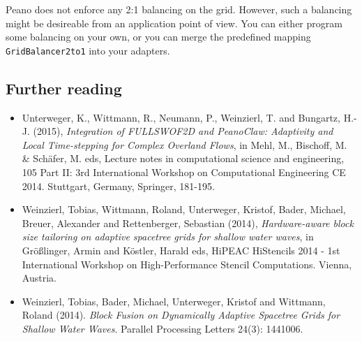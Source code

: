 \begin{remark}
Peano does not enforce any 2:1 balancing on the grid. However, such a balancing
might be desireable from an application point of view. You can either program
some balancing on your own, or you can merge the predefined mapping
\texttt{GridBalancer2to1} into your adapters.
\end{remark}




\subsection*{Further reading}

\begin{itemize}
  \item   Unterweger, K., Wittmann, R., Neumann, P., Weinzierl, T. and Bungartz,
  H.-J.
(2015), {\em Integration of FULLSWOF2D and PeanoClaw: Adaptivity and Local
Time-stepping for Complex Overland Flows}, in Mehl, M., Bischoff, M. & Schäfer,
M. eds, Lecture notes in computational science and engineering, 105 Part II: 3rd International Workshop on Computational Engineering CE 2014. Stuttgart, Germany, Springer, 181-195.
\item Weinzierl, Tobias, Wittmann, Roland, Unterweger, Kristof, Bader, Michael,
Breuer, Alexander and Rettenberger, Sebastian (2014), {\em Hardware-aware block
size tailoring on adaptive spacetree grids for shallow water waves}, in
Gr\"o\ss linger, Armin and K\"ostler, Harald eds, HiPEAC HiStencils 2014 - 1st
International Workshop on High-Performance Stencil Computations. Vienna, Austria.
\item Weinzierl, Tobias, Bader, Michael, Unterweger, Kristof and Wittmann,
Roland (2014). {\em Block Fusion on Dynamically Adaptive Spacetree Grids for
Shallow Water Waves}. Parallel Processing Letters 24(3): 1441006.
\end{itemize}



